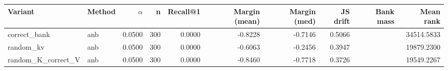 \begin{tabular}{l l r r r r r r r r}
\toprule
Variant & Method & $\alpha$ & n & Recall@1 & Margin (mean) & Margin (med) & JS drift & Bank mass & Mean rank \\
\midrule
correct\_bank & anb & 0.0500 & 300 & 0.0000 & -0.8228 & -0.7146 & 0.5066 &  & 34514.5833 \\
random\_kv & anb & 0.0500 & 300 & 0.0000 & -0.6063 & -0.2456 & 0.3947 &  & 19879.2300 \\
random\_K\_correct\_V & anb & 0.0500 & 300 & 0.0000 & -0.8460 & -0.7718 & 0.3726 &  & 19549.2267 \\
\bottomrule
\end{tabular}
